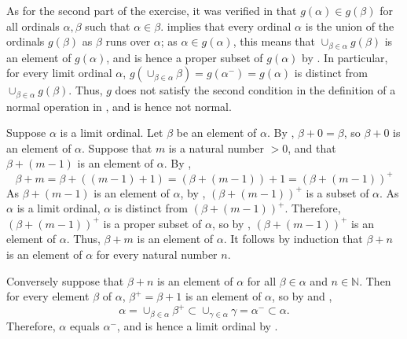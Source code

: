 \documentclass{article}
\begin{document}
\begin{solution}[\ref{exe:wezu6n6e}]
  As for the second part of the exercise, it was verified in
   that \(g(\alpha) \in g(\beta)\) for all ordinals
  \(\alpha, \beta\) such that \(\alpha \in \beta\).
   implies that every ordinal \(\alpha\) is the
  union of the ordinals \(g(\beta)\) as \(\beta\) runs over
  \(\alpha\); as \(\alpha \in g(\alpha)\), this means that
  \(\cup_{\beta \in \alpha} g(\beta)\) is an element of \(g(\alpha)\),
  and is hence a proper subset of \(g(\alpha)\) by
  .  In particular, for every limit ordinal
  \(\alpha\),
  \(g(\cup_{\beta \in \alpha} \beta) = g(\alpha^-) = g(\alpha)\) is
  distinct from \(\cup_{\beta \in \alpha} g(\beta)\).  Thus, \(g\)
  does not satisfy the second condition in the definition of a normal
  operation in , and is hence not normal.
\end{solution}

\begin{solution}[\ref{exe:fl6hcnkt}]
  \label{sol:7p9qk0t3}
  Suppose \(\alpha\) is a limit ordinal.  Let \(\beta\) be an element
  of \(\alpha\).  By , \(\beta + 0 = \beta\), so
  \(\beta + 0\) is an element of \(\alpha\).  Suppose that \(m\) is a
  natural number \(> 0\), and that \(\beta + (m-1)\) is an element of
  \(\alpha\).  By ,
  \begin{displaymath}
    \beta + m = \beta + ((m-1) + 1) = (\beta + (m-1)) + 1 =
    (\beta + (m-1))^+
  \end{displaymath}
  As \(\beta + (m-1)\) is an element of \(\alpha\), by
  , \((\beta + (m-1))^+\) is a subset of
  \(\alpha\).  As \(\alpha\) is a limit ordinal, \(\alpha\) is
  distinct from \((\beta + (m-1))^+\).  Therefore,
  \((\beta + (m-1))^+\) is a proper subset of \(\alpha\), so by
  , \((\beta + (m-1))^+\) is an element of
  \(\alpha\).  Thus, \(\beta + m\) is an element of \(\alpha\).  It
  follows by induction that \(\beta + n\) is an element of \(\alpha\)
  for every natural number \(n\).

  Conversely suppose that \(\beta + n\) is an element of \(\alpha\)
  for all \(\beta \in \alpha\) and \(n \in \mathbb{N}\).  Then for
  every element \(\beta\) of \(\alpha\), \(\beta^+ = \beta + 1\) is an
  element of \(\alpha\), so by  and
  ,
  \begin{displaymath}
    \alpha = \cup_{\beta \in \alpha} \beta^+ \subset
    \cup_{\gamma \in \alpha} \gamma = \alpha^-
    \subset \alpha.
  \end{displaymath}
  Therefore, \(\alpha\) equals \(\alpha^-\), and is hence a limit
  ordinal by .
\end{solution}
\end{document}
